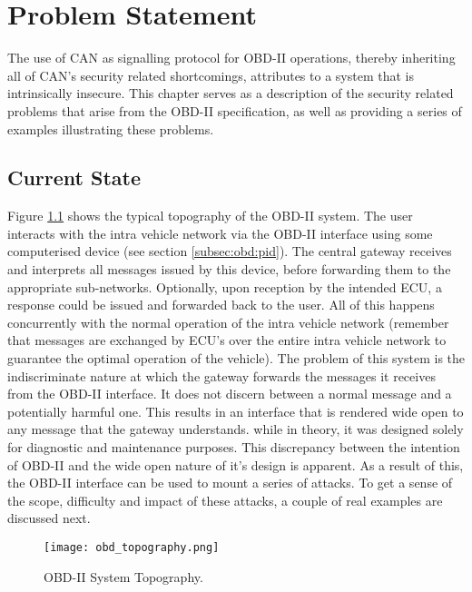 
\chapter{Problem Statement}
\label{chap:problem_statement}

The use of CAN as signalling protocol for OBD-II operations, thereby inheriting all of CAN's security related shortcomings, attributes to a system that is intrinsically insecure. This chapter serves as a description of the security related problems that arise from the OBD-II specification, as well as providing a series of examples illustrating these problems.

\section{Current State}
\label{sec:current_state}

Figure \ref{fig:topography} shows the typical topography of the OBD-II system. The user interacts with the intra vehicle network via the OBD-II interface using some computerised device (see section \ref{subsec:obd:pid}). The central gateway receives and interprets all messages issued by this device, before forwarding them to the appropriate sub-networks. Optionally, upon reception by the intended ECU, a response could be issued and forwarded back to the user. All of this happens concurrently with the normal operation of the intra vehicle network (remember that messages are exchanged by ECU's over the entire intra vehicle network to guarantee the optimal operation of the vehicle). The problem of this system is the indiscriminate nature at which the gateway forwards the messages it receives from the OBD-II interface. It does not discern between a normal message and a potentially harmful one. This results in an interface that is rendered wide open to any message that the gateway understands. while in theory, it was designed solely for diagnostic and maintenance purposes. This discrepancy between the intention of OBD-II and the wide open nature of it's design is apparent. As a result of this, the OBD-II interface can be used to mount a series of attacks. To get a sense of the scope, difficulty and impact of these attacks, a couple of real examples are discussed next.

\begin{figure}[h]
	\label{fig:topography}
	\centering
	\texttt{[image: obd\_topography.png]}
	\caption{OBD-II System Topography.}
\end{figure}


